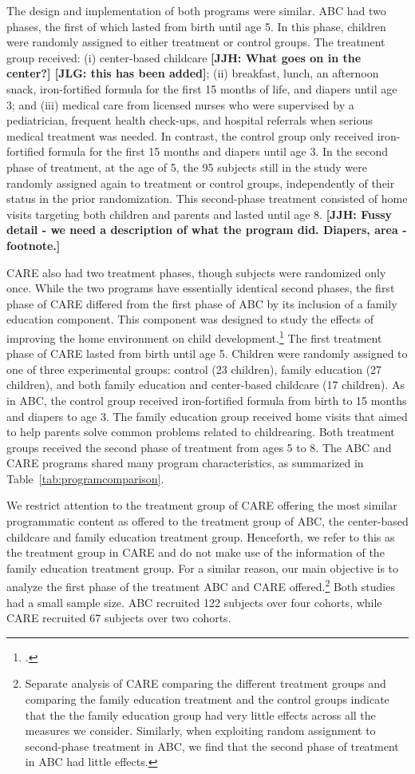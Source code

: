 The design and implementation of both programs were similar. ABC had two phases, the first of which lasted from birth until age 5. In this phase, children were randomly assigned to either treatment or control groups. The treatment group received: (i) center-based childcare \textbf{[JJH: What goes on in the center?] [JLG: this has been added]}; (ii) breakfast, lunch, an afternoon snack, iron-fortified formula for the first 15 months of life, and diapers until age 3; and (iii) medical care from licensed nurses who were supervised by a pediatrician, frequent health check-ups, and hospital referrals when serious medical treatment was needed. In contrast, the control group only received iron-fortified formula for the first 15 months and diapers until age 3. In the second phase of treatment, at the age of 5, the 95 subjects still in the study were randomly assigned again to treatment or control groups, independently of their status in the prior randomization. This second-phase treatment consisted of home visits targeting both children and parents and lasted until age 8. \textbf{[JJH: Fussy detail - we need a description of what the program did. Diapers, area - footnote.]}

CARE also had two treatment phases, though subjects were randomized only once. While the two programs have essentially identical second phases, the first phase of CARE differed from the first phase of ABC by its inclusion of a family education component. This component was designed to study the effects of improving the home environment on child development.\footnote{\citet{Wasik_Ramey_etal_1990_CD}.} The first treatment phase of CARE lasted from birth until age 5. Children were randomly assigned to one of three experimental groups: control (23 children), family education (27 children), and both family education and center-based childcare (17 children). As in ABC, the control group received iron-fortified formula from birth to 15 months and diapers to age 3. The family education group received home visits that aimed to help parents solve common problems related to childrearing. Both treatment groups received the second phase of treatment from ages 5 to 8. The ABC and CARE programs shared many program characteristics, as summarized in Table~\ref{tab:programcomparison}.

We restrict attention to the treatment group of CARE offering the most similar programmatic content as offered to the treatment group of ABC, the center-based childcare and family education treatment group. Henceforth, we refer to this as the treatment group in CARE and do not make use of the information of the family education treatment group. For a similar reason, our main objective is to analyze the first phase of the treatment ABC and CARE offered.\footnote{Separate analysis of CARE comparing the different treatment groups and comparing the family education treatment and the control groups indicate that the the family education group had very little effects across all the measures we consider. Similarly, when exploiting random assignment to second-phase treatment in ABC, we find that the second phase of treatment in ABC had little effects.} Both studies had a small sample size. ABC recruited 122 subjects over four cohorts, while CARE recruited 67 subjects over two cohorts.

